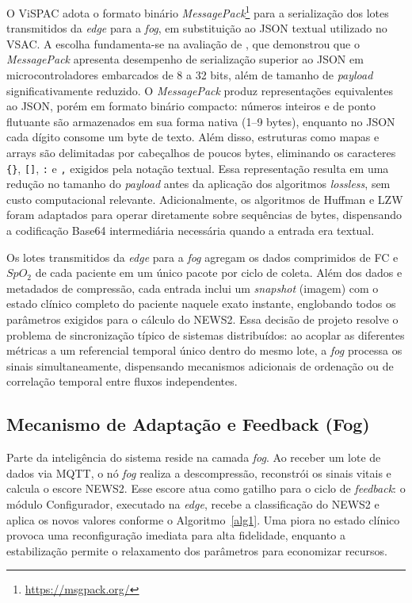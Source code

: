 \documentclass[twoside,english,brazilian]{UNISINOSmonografia}
\begin{document}
O ViSPAC adota o formato binário \textit{MessagePack}\footnote{\url{https://msgpack.org/}} para a serialização dos lotes transmitidos da \textit{edge} para a \textit{fog}, em substituição ao JSON textual utilizado no VSAC. A escolha fundamenta-se na avaliação de \cite{Friesel2021}, que demonstrou que o \textit{MessagePack} apresenta desempenho de serialização superior ao JSON em microcontroladores embarcados de 8 a 32 bits, além de tamanho de \textit{payload} significativamente reduzido. O \textit{MessagePack} produz representações equivalentes ao JSON, porém em formato binário compacto: números inteiros e de ponto flutuante são armazenados em sua forma nativa (1--9 bytes), enquanto no JSON cada dígito consome um byte de texto. Além disso, estruturas como mapas e arrays são delimitadas por cabeçalhos de poucos bytes, eliminando os caracteres \texttt{\{\}}, \texttt{[]}, \texttt{:} e \texttt{,} exigidos pela notação textual. Essa representação resulta em uma redução no tamanho do \textit{payload} antes da aplicação dos algoritmos \textit{lossless}, sem custo computacional relevante. Adicionalmente, os algoritmos de Huffman e LZW foram adaptados para operar diretamente sobre sequências de bytes, dispensando a codificação Base64 intermediária necessária quando a entrada era textual.

Os lotes transmitidos da \textit{edge} para a \textit{fog} agregam os dados comprimidos de FC e $SpO_2$ de cada paciente em um único pacote por ciclo de coleta. Além dos dados e metadados de compressão, cada entrada inclui um \textit{snapshot} (imagem) com o estado clínico completo do paciente naquele exato instante, englobando todos os parâmetros exigidos para o cálculo do NEWS2. Essa decisão de projeto resolve o problema de sincronização típico de sistemas distribuídos: ao acoplar as diferentes métricas a um referencial temporal único dentro do mesmo lote, a \textit{fog} processa os sinais simultaneamente, dispensando mecanismos adicionais de ordenação ou de correlação temporal entre fluxos independentes.

\subsection{Mecanismo de Adaptação e Feedback (Fog)}

Parte da inteligência do sistema reside na camada \textit{fog}. Ao receber um lote de dados via MQTT, o nó \textit{fog} realiza a descompressão, reconstrói os sinais vitais e calcula o escore NEWS2. Esse escore atua como gatilho para o ciclo de \textit{feedback}: o módulo Configurador, executado na \textit{edge}, recebe a classificação do NEWS2 e aplica os novos valores conforme o Algoritmo~\ref{alg1}. Uma piora no estado clínico provoca uma reconfiguração imediata para alta fidelidade, enquanto a estabilização permite o relaxamento dos parâmetros para economizar recursos.
\end{document}
